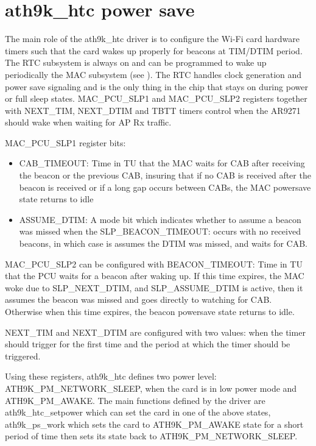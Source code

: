 \section{ath9k_htc power save}
\label{sec:ath9khtc}

The main role of the ath9k_htc driver is to configure the Wi-Fi card hardware timers such that the card wakes up properly for beacons at TIM/DTIM period. The RTC subsystem is always on and can be programmed to wake up periodically the MAC subsystem (see ). The RTC handles clock generation and power save signaling and is the only thing in the chip that stays on during power or full sleep states. MAC_PCU_SLP1 and MAC_PCU_SLP2 registers together  with NEXT_TIM, NEXT_DTIM and TBTT timers control when the AR9271 should wake when waiting for AP Rx traffic.

MAC_PCU_SLP1 register bits:
\begin{itemize}
\item CAB_TIMEOUT: Time in TU that the MAC waits for CAB after receiving the beacon or the previous
CAB, insuring that if no CAB is received after the beacon is received or if a long gap occurs between CABs, the MAC powersave state returns to idle
\item ASSUME_DTIM: A mode bit which indicates whether to assume a beacon was missed when the
SLP_BEACON_TIMEOUT: occurs with no received beacons, in which case is assumes
the DTIM was missed, and waits for CAB.
\end{itemize}

MAC_PCU_SLP2 can be configured with BEACON_TIMEOUT: Time in TU that the PCU waits for a beacon after waking up. If this time expires, the MAC woke due to SLP_NEXT_DTIM, and SLP_ASSUME_DTIM is active, then it assumes the beacon was missed and goes directly to watching for CAB. Otherwise when this time expires, the beacon powersave state returns to idle.

NEXT_TIM and NEXT_DTIM are configured with two values: when the timer should trigger for the first time and the period at which the timer should be triggered.

Using these registers, ath9k_htc defines two power level: ATH9K_PM_NETWORK_SLEEP, when the card is in low power mode and ATH9K_PM_AWAKE. The main functions defined by the driver are ath9k_htc_setpower which can set the card in one of the above states, ath9k_ps_work which sets the card to ATH9K_PM_AWAKE state for a short period of time then sets its state back to ATH9K_PM_NETWORK_SLEEP.

